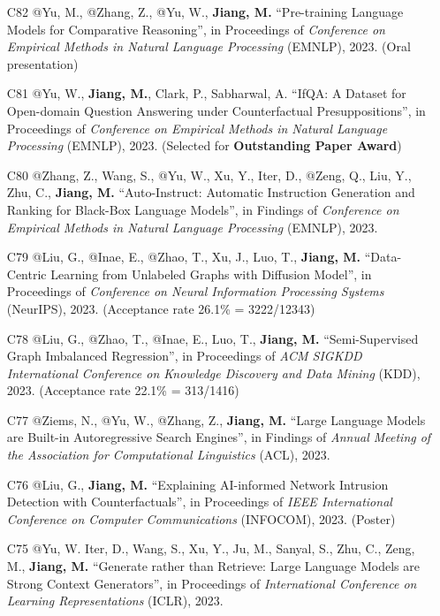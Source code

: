 \documentclass[10pt]{article}
\newenvironment{myindentpar}[1]%
{\begin{list}{}%
         {\setlength{\leftmargin}{#1}}%
         \item[]%
}
{\end{list}}
\newcounter{list}
\begin{document}
\begin{myindentpar}{0.00cm}
\begin{enumerate}[leftmargin=.5cm]
\item[C82] @Yu, M., @Zhang, Z., @Yu, W., \textbf{Jiang, M.} ``Pre-training Language Models for Comparative Reasoning'', in Proceedings of \textit{Conference on Empirical Methods in Natural Language Processing} (EMNLP), 2023. (Oral presentation)

\item[C81] @Yu, W., \textbf{Jiang, M.}, Clark, P., Sabharwal, A. ``IfQA: A Dataset for Open-domain Question Answering under Counterfactual Presuppositions'', in Proceedings of \textit{Conference on Empirical Methods in Natural Language Processing} (EMNLP), 2023. (Selected for \textbf{Outstanding Paper Award})

\item[C80] @Zhang, Z., Wang, S., @Yu, W., Xu, Y., Iter, D., @Zeng, Q., Liu, Y., Zhu, C., \textbf{Jiang, M.} ``Auto-Instruct: Automatic Instruction Generation and Ranking for Black-Box Language Models'', in Findings of \textit{Conference on Empirical Methods in Natural Language Processing} (EMNLP), 2023.

\item[C79] @Liu, G., @Inae, E., @Zhao, T., Xu, J., Luo, T., \textbf{Jiang, M.} ``Data-Centric Learning from Unlabeled Graphs with Diffusion Model'', in Proceedings of \textit{Conference on Neural Information Processing Systems} (NeurIPS), 2023. (Acceptance rate 26.1\% = 3222/12343)

\item[C78] @Liu, G., @Zhao, T., @Inae, E., Luo, T., \textbf{Jiang, M.} ``Semi-Supervised Graph Imbalanced Regression'', in Proceedings of \textit{ACM SIGKDD International Conference on Knowledge Discovery and Data Mining} (KDD), 2023. (Acceptance rate 22.1\% = 313/1416)
		
\item[C77] @Ziems, N., @Yu, W., @Zhang, Z., \textbf{Jiang, M.} ``Large Language Models are Built-in Autoregressive Search Engines'', in Findings of \textit{Annual Meeting of the Association for Computational Linguistics} (ACL), 2023.

\item[C76] @Liu, G., \textbf{Jiang, M.} ``Explaining AI-informed Network Intrusion Detection with Counterfactuals'', in Proceedings of \textit{IEEE International Conference on Computer Communications} (INFOCOM), 2023. (Poster)
		
\item[C75] @Yu, W. Iter, D., Wang, S., Xu, Y., Ju, M., Sanyal, S., Zhu, C., Zeng, M., \textbf{Jiang, M.} ``Generate rather than Retrieve: Large Language Models are Strong Context Generators'', in Proceedings of \textit{International Conference on Learning Representations} (ICLR), 2023.


\end{enumerate}
\end{myindentpar}
\end{document}
